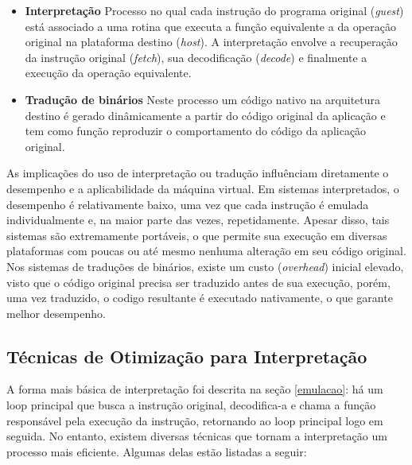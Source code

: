 \documentclass[11pt,twoside]{article}
\begin{document}
\begin{itemize}
 \item \textbf{Interpretação} Processo no qual cada instrução do programa original (\emph{guest}) está associado a uma rotina que executa a função equivalente a da operação original na plataforma destino (\emph{host}).
		A interpretação envolve a recuperação da instrução original (\emph{fetch}), sua decodificação (\emph{decode}) e finalmente a execução da operação equivalente.
 
 \item \textbf{Tradução de binários} Neste processo um código nativo na arquitetura destino é gerado dinâmicamente a partir do código original da aplicação e tem como função reproduzir o comportamento do código da aplicação original\cite{Sites1993}. 
\end{itemize}

As implicações do uso de interpretação ou tradução influênciam diretamente o desempenho e a aplicabilidade da máquina virtual.
Em sistemas interpretados, o desempenho é relativamente baixo, uma vez que cada instrução é emulada individualmente e, na maior parte das vezes, repetidamente.
Apesar disso, tais sistemas são extremamente portáveis, o que permite sua execução em diversas plataformas com poucas ou até mesmo nenhuma alteração em seu código original.
Nos sistemas de traduções de binários, existe um custo (\emph{overhead}) inicial elevado, visto que o código original precisa ser traduzido antes de sua execução, porém, uma vez traduzido, o codigo resultante é executado nativamente, o que garante melhor desempenho.




\subsection{Técnicas de Otimização para Interpretação}

A forma mais básica de interpretação foi descrita na seção \ref{emulacao}: há um loop principal que busca a instrução original, decodifica-a e chama a função responsável pela execução da instrução, retornando ao loop principal logo em seguida. No entanto, existem diversas técnicas que tornam a interpretação um processo mais eficiente. Algumas delas estão listadas a seguir:
\end{document}
